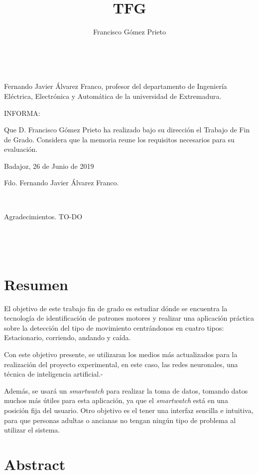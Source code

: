 \documentclass[12pt]{book}
\title{TFG}
\author{Francisco Gómez Prieto}
\date{}
\numberwithin{equation}{section}
\begin{document}
\pagestyle{empty}
\lstset{language=Java}


\newpage
~

\newpage
Fernando Javier Álvarez Franco, profesor del departamento de Ingeniería Eléctrica, Electrónica y Automática de la universidad de Extremadura.

INFORMA:

Que D. Francisco Gómez Prieto ha realizado bajo su dirección el Trabajo de Fin de Grado. Considera que la memoria reune los requisitos necesarios para su evaluación.

\medskip

\begin{flushright}
Badajoz, 26 de Junio de 2019
\end{flushright}

\vspace{8\baselineskip}
\begin{center}
Fdo. Fernando Javier Álvarez Franco.
\end{center}
\newpage
~
\newpage

Agradecimientos. TO-DO

\newpage
~
\newpage
\setcounter{page}{1}
\pagestyle{plain}
\tableofcontents

\newpage
~

\newpage
\section*{Resumen}
El objetivo de este trabajo fin de grado es estudiar dónde se encuentra la tecnología de identificación de patrones motores y realizar una aplicación práctica sobre la detección del tipo de movimiento centrándonos en cuatro tipos: Estacionario, corriendo, andando y caída.

Con este objetivo presente, se utilizaran los medios más actualizados para la realización del proyecto experimental, en este caso, las redes neuronales, una técnica de inteligencia artificial.-

Además, se usará un \textit{smartwatch} para realizar la toma de datos, tomando datos muchos más útiles para esta aplicación, ya que el \textit{smartwatch} está en una posición fija del usuario. Otro objetivo es el tener una interfaz sencilla e intuitiva, para que personas adultas o ancianas no tengan ningún tipo de problema al utilizar el sistema.


\newpage
\section*{Abstract}
\end{document}
